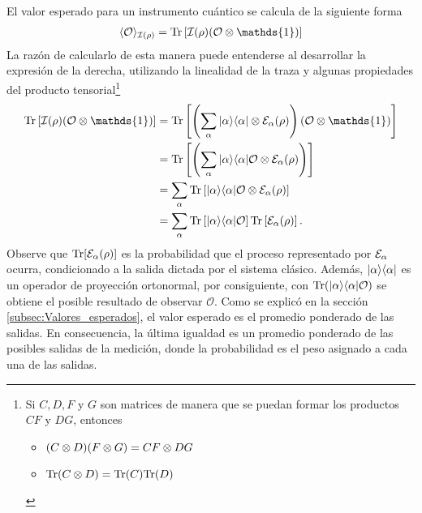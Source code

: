 El valor esperado para un instrumento cuántico se calcula de la siguiente forma
\begin{equation}\label{eq:expected-value-quantum-instrument}
\begin{split}
    \la\mathcal{O}\ra_{\mathcal{I}(\rho)}&=\tr\left[\mathcal{I}(\rho)(\mathcal{O}\tensor\mathds{1})\right]\\
\end{split}
\end{equation} La razón de calcularlo de esta manera puede entenderse al
desarrollar la expresión de la derecha, utilizando la linealidad de la traza y
algunas propiedades del producto tensorial\footnote{Si $C, D, F$ y $G$ son
matrices de manera que se puedan formar los productos $CF$ y $DG$,
entonces
\begin{itemize}
\item $(C\otimes D)(F\otimes G)=CF\otimes DG$ 
\item ${\rm Tr}(C\otimes D)={\rm Tr}(C){\rm Tr}(D)$
\end{itemize}}
\[\begin{split}
   \tr\left[\mathcal{I}(\rho)(\mathcal{O}\tensor\mathds{1})\right]&=\tr\left[\left(\sum_\alpha |\alpha\rala\alpha|\otimes \E_\alpha(\rho)\right)(\mathcal{O}\tensor\mathds{1})\right]\\
   &=\tr\left[\left(\sum_\alpha |\alpha\rala\alpha|\mathcal{O}\otimes \E_\alpha(\rho)\right)\right]\\
   &=\sum_\alpha\tr\left[|\alpha\rala\alpha|\mathcal{O}\otimes \E_\alpha(\rho)\right]\\
   &=\sum_\alpha\tr\left[|\alpha\rala\alpha|\mathcal{O}\right]\tr\left[\E_\alpha(\rho)\right].
\end{split}\] 
Observe que ${\rm Tr}[\mathcal{E}_\alpha(\rho)]$ es la probabilidad que el proceso
representado por $\mathcal{E}_\alpha$ ocurra, condicionado a la salida dictada por el
sistema clásico.  Además, $|\alpha\rangle \langle \alpha|$ es un operador de proyección
ortonormal, por consiguiente, con ${\rm Tr}(|\alpha\rangle \langle\alpha|\mathcal{O})$ se
obtiene el posible resultado de observar $\mathcal{O}$. Como se explicó en la
sección  {\ref{subsec:Valores_esperados}}, el valor esperado es el promedio
ponderado de las salidas. En consecuencia, la última igualdad es un promedio
ponderado de las posibles salidas de la medición, donde la probabilidad es el
peso asignado a cada una de las salidas.


